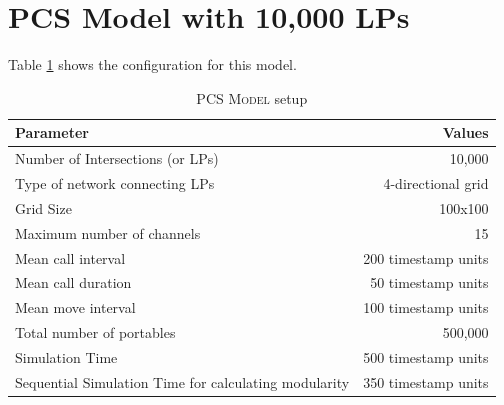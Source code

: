 \documentclass[11pt]{book}
\begin{document}
\clearpage
\section[\textsc{pcs-10k lp}s]{PCS Model with 10,000 LPs}

Table \ref{table:pcs_10k_config} shows the configuration for this model.

\begin{table}
    \centering
    \begin{tabular}{|| l | r ||}
        \hline
        Parameter                           &   Values\\ [0.5ex]
        \hline\hline
        Number of Intersections (or LPs)    &   10,000\\
        Type of network connecting LPs      &   4-directional grid\\
        Grid Size                           &   100x100\\
        Maximum number of channels          &   15\\
        Mean call interval                  &   200 timestamp units\\
        Mean call duration                  &   50 timestamp units\\
        Mean move interval                  &   100 timestamp units\\
        Total number of portables           &   500,000\\
        Simulation Time                     &   500 timestamp units\\
        Sequential Simulation Time for calculating modularity   &   350 timestamp units\\
        \hline
    \end{tabular}
    \caption{\textsc{PCS Model} setup}\label{table:pcs_10k_config}
\end{table}
\end{document}
